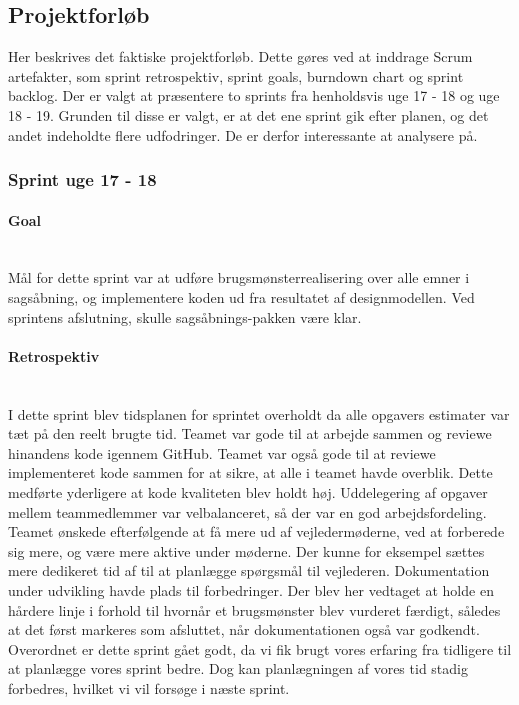 \documentclass[../../main.tex]{subfiles}
\begin{document}
\subsection{Projektforløb}
Her beskrives det faktiske projektforløb. Dette gøres ved at inddrage Scrum artefakter, som sprint retrospektiv, sprint goals, burndown chart og sprint backlog.
Der er valgt at præsentere to sprints fra henholdsvis uge 17 - 18 og uge 18 - 19. Grunden til disse er valgt, er at det ene sprint gik efter planen, og det andet indeholdte flere udfodringer. De er derfor interessante at analysere på. 

\subsubsection{Sprint uge 17 - 18}
\paragraph{Goal}\mbox{}\\
Mål for dette sprint var at udføre brugsmønsterrealisering over alle emner i sagsåbning, og implementere koden ud fra resultatet af designmodellen. Ved sprintens afslutning, skulle sagsåbnings-pakken være klar.

\paragraph{Retrospektiv}\mbox{}\\
I dette sprint blev tidsplanen for sprintet overholdt da alle opgavers estimater var tæt på den reelt brugte tid. Teamet var gode til at arbejde sammen og reviewe hinandens kode igennem GitHub. Teamet var også gode til at reviewe implementeret kode sammen for at sikre, at alle i teamet havde overblik. Dette medførte yderligere at kode kvaliteten blev holdt høj. Uddelegering af opgaver mellem teammedlemmer var velbalanceret, så der var en god arbejdsfordeling. \\
Teamet ønskede efterfølgende at få mere ud af vejledermøderne, ved at forberede sig mere, og være mere aktive under møderne. Der kunne for eksempel sættes mere dedikeret tid af til at planlægge spørgsmål til vejlederen. Dokumentation under udvikling havde plads til forbedringer. Der blev her vedtaget at holde en hårdere linje i forhold til hvornår et brugsmønster blev vurderet færdigt, således at det først markeres som afsluttet, når dokumentationen også var godkendt.       
Overordnet er dette sprint gået godt, da vi fik brugt vores erfaring fra tidligere til at planlægge vores sprint bedre. Dog kan planlægningen af vores tid stadig forbedres, hvilket vi vil forsøge i næste sprint.
\end{document}
